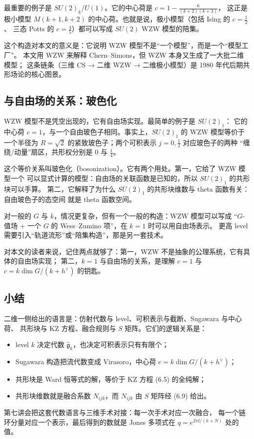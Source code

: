 最重要的例子是 $SU(2)_k/U(1)$。它的中心荷是 $c=1-\frac{6}{(k+2)(k+3)}$，
这正是极小模型 $M(k+1,k+2)$ 的中心荷。也就是说，极小模型（包括 Ising 的 $c=\frac12$、
三态 Potts 的 $c=\frac45$）都可以写成 $SU(2)$ WZW 模型的陪集。

这个构造对本文的意义是：它说明 WZW 模型不是“一个模型”，而是一个“模型工厂”。
本文用 WZW 来解释 Chern--Simons，但 WZW 本身又生成了一大批二维模型；
这条链条（三维 CS → 二维 WZW → 二维极小模型）是 1980 年代后期共形场论的核心图景。

\subsection{与自由场的关系：玻色化}

WZW 模型不是凭空出现的，它有自由场实现。最简单的例子是 $SU(2)_1$：
它的中心荷 $c=1$，与一个自由玻色子相同。事实上，$SU(2)_1$ 的 WZW 模型等价于
一个半径为 $R=\sqrt2$ 的紧致玻色子；两个可积表示 $j=0,\frac12$ 对应玻色子的两种
“缠绕/动量”扇区，共形权分别是 $0$ 与 $\frac14$。

这个等价关系叫玻色化（bosonization）。它有两个用处。第一，它给了 WZW 模型一个
可以显式计算的模型：自由场的关联函数是已知的，所以 $SU(2)_1$ 的共形块可以手算。
第二，它解释了为什么 $SU(2)_1$ 的共形块维数与 theta 函数有关：自由玻色子的态空间
就是 theta 函数空间。

对一般的 $G$ 与 $k$，情况更复杂，但有一个一般的构造：WZW 模型可以写成
“$G$-值场 + 一个 $G$ 的 Wess--Zumino 项”，在 $k=1$ 时可以用自由场表示。
更高 level 需要引入“轨道流形”或“陪集构造”，那是另一套技术。

对本文的读者来说，记住两点就够了：第一，WZW 不是抽象的公理系统，它有具体的自由场实现；
第二，$k=1$ 与自由场的关系，是理解 $c=1$ 与 $c=k\dim G/(k+h^\vee)$ 的钥匙。

\subsection{小结}

二维一侧给出的语言是：仿射代数与 level、可积表示与截断、Sugawara 与中心荷、
共形块与 KZ 方程、融合规则与 $S$ 矩阵。它们的逻辑关系是：
\begin{itemize}[leftmargin=*]
  \item level $k$ 决定代数 $\hat{\mathfrak g}_k$，也决定可积表示只有有限个；
  \item Sugawara 构造把流代数变成 Virasoro，中心荷 $c=k\dim G/(k+h^\vee)$；
  \item 共形块是 Ward 恒等式的解，等价于 KZ 方程 (6.5) 的全纯解；
  \item 共形块维数就是融合系数 $N_{ijk}$，而 $N_{ijk}$ 由 $S$ 矩阵经 (6.9) 给出。
\end{itemize}
第七讲会把这套代数语言与三维手术对接：每一次手术对应一次融合，
每一个链环分量对应一个表示，最后得到的数就是 Jones 多项式在 $q=e^{2\pi\ii/(k+N)}$ 处的值。

